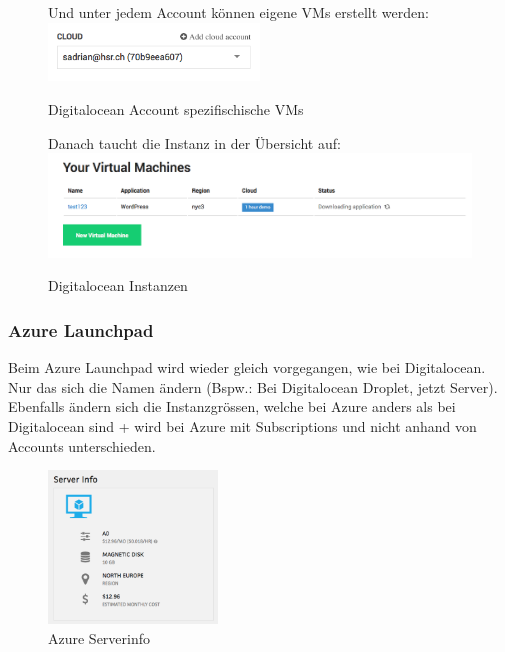 \begin{figure}[!htbp]
\centering
Und unter jedem Account können eigene VMs erstellt werden:\\
\includegraphics[width=0.5\textwidth]{./03_Analyse/03_Bitnami/images/digitalocean_account_specific}
\caption{Digitalocean Account spezifischische VMs}
\end{figure}

\begin{figure}[!htbp]
 \centering
Danach taucht die Instanz in der Übersicht auf:
\includegraphics[width=\textwidth]{./03_Analyse/03_Bitnami/images/digitalocean_instances}
\caption{Digitalocean Instanzen}
\end{figure}

\newpage

\subsubsection{Azure Launchpad\autocite{azure}}
Beim Azure Launchpad wird wieder gleich vorgegangen, wie bei Digitalocean.
Nur das sich die Namen ändern (Bspw.: Bei Digitalocean Droplet, jetzt Server).
\newline
Ebenfalls ändern sich die Instanzgrössen, welche bei Azure anders als bei 
Digitalocean sind + wird bei Azure mit Subscriptions und nicht anhand von 
Accounts unterschieden.


\begin{figure}[!htbp]
\centering
\includegraphics[width=0.4\textwidth]{./03_Analyse/03_Bitnami/images/azure_serverinfo}
\caption{Azure Serverinfo}
\end{figure}

